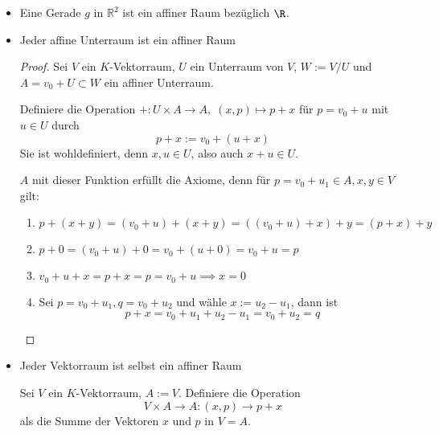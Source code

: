 \documentclass[a4paper, 10pt]{scrbook}
\begin{document}
\begin{ex}
\begin{itemize}
\item Eine Gerade $g$ in $\mathbb R ^2$ ist ein affiner Raum bezüglich $\R$.
\item Jeder affine Unterraum ist ein affiner Raum

	\begin{proof}
		Sei $V$ ein $K$-Vektorraum, $U$ ein Unterraum von $V$, $W:=V/U$ und $A = v_0 + U \subset W$ ein affiner Unterraum.

Definiere die Operation $+: U\times A\to A,\; (x,p)\mapsto p+x$ für $p = v_0 + u$ mit $u\in U$ durch
\[
p+x := v_0 + (u+x) 
\]
Sie ist wohldefiniert, denn $x,u\in U$, also auch $x+u\in U$.

$A$ mit dieser Funktion erfüllt die Axiome, denn für $p=v_0+u_1\in A, x,y\in V$ gilt:
\begin{enumerate}[{A}1:]
	\item $p+(x+y) = (v_0+u)+(x+y) = ((v_0+u)+x)+y = (p+x)+y$
	\item $p+0 = (v_0+u)+0=v_0+(u+0)=v_0+u=p$
	\item $v_0+u+x=p+x=p=v_0+u \implies x=0$
	\item Sei $p=v_0+u_1, q=v_0+u_2$ und wähle $x:= u_2-u_1$, dann ist
		\[
			p+x = v_0+u_1+u_2-u_1 = v_0+u_2 = q
		\]
\end{enumerate}
\end{proof}

\item Jeder Vektorraum ist selbst ein affiner Raum

Sei $V$ ein $K$-Vektorraum, $A := V$. Definiere die Operation
\[
V\times A \rightarrow A : (x,p) \rightarrow p+x
\]
als die Summe der Vektoren $x$ und $p$ in $V=A$.
\end{itemize}
\end{ex}
\end{document}
